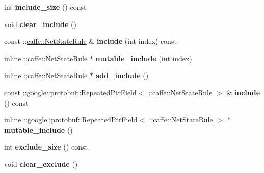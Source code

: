 \begin{DoxyCompactItemize}
int {\bfseries include\+\_\+size} () const
\item 
\mbox{\label{classcaffe_1_1_v1_layer_parameter_ab3adf42bfa782aa442f57bc79a80384b}} 
void {\bfseries clear\+\_\+include} ()
\item 
\mbox{\label{classcaffe_1_1_v1_layer_parameter_a96b3149df0a7ed32e0fac2b4f7c9e43b}} 
const \+::\mbox{\hyperlink{classcaffe_1_1_net_state_rule}{caffe\+::\+Net\+State\+Rule}} \& {\bfseries include} (int index) const
\item 
\mbox{\label{classcaffe_1_1_v1_layer_parameter_a9f8b9a1c09fd3065ddcc4ff11503388c}} 
inline \+::\mbox{\hyperlink{classcaffe_1_1_net_state_rule}{caffe\+::\+Net\+State\+Rule}} $\ast$ {\bfseries mutable\+\_\+include} (int index)
\item 
\mbox{\label{classcaffe_1_1_v1_layer_parameter_af0b4ab621af0774414b8dc18a54feada}} 
inline \+::\mbox{\hyperlink{classcaffe_1_1_net_state_rule}{caffe\+::\+Net\+State\+Rule}} $\ast$ {\bfseries add\+\_\+include} ()
\item 
\mbox{\label{classcaffe_1_1_v1_layer_parameter_a2bacf70a34f18452a52a7b4125cf9650}} 
const \+::google\+::protobuf\+::\+Repeated\+Ptr\+Field$<$ \+::\mbox{\hyperlink{classcaffe_1_1_net_state_rule}{caffe\+::\+Net\+State\+Rule}} $>$ \& {\bfseries include} () const
\item 
\mbox{\label{classcaffe_1_1_v1_layer_parameter_abf8896d1340efa485e2115989ac0fd9d}} 
inline \+::google\+::protobuf\+::\+Repeated\+Ptr\+Field$<$ \+::\mbox{\hyperlink{classcaffe_1_1_net_state_rule}{caffe\+::\+Net\+State\+Rule}} $>$ $\ast$ {\bfseries mutable\+\_\+include} ()
\item 
\mbox{\label{classcaffe_1_1_v1_layer_parameter_ab33c88707ad3518288c15f3f1569e88a}} 
int {\bfseries exclude\+\_\+size} () const
\item 
\mbox{\label{classcaffe_1_1_v1_layer_parameter_ab43037fdeacf8f3903499a91111a5fc7}} 
void {\bfseries clear\+\_\+exclude} ()

\end{DoxyCompactItemize}
